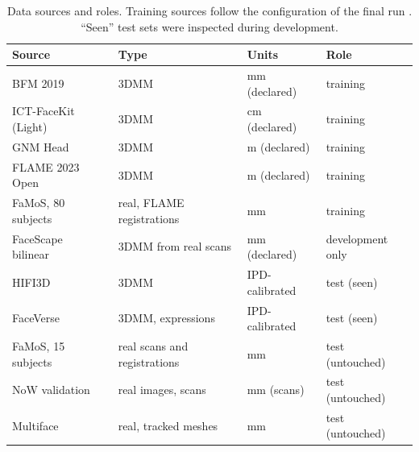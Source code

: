 \begin{table}[!ht]
\centering
\small
\caption{Data sources and roles. Training sources follow the configuration
of the final run . ``Seen'' test sets were inspected during development.}
\label{tab:domain_roles}
\begin{tabular}{llll}
\toprule
Source & Type & Units & Role \\
\midrule
BFM 2019~\cite{bfm2019}            & 3DMM          & mm (declared)       & training \\
ICT-FaceKit (Light)~\cite{ict-facekit} & 3DMM      & cm (declared)       & training \\
GNM Head~\cite{gnm}                & 3DMM          & m (declared)        & training \\
FLAME 2023 Open~\cite{flame}       & 3DMM          & m (declared)        & training \\
FaMoS, 80 subjects~\cite{famos}    & real, FLAME registrations & mm      & training \\
\midrule
FaceScape bilinear~\cite{facescape} & 3DMM from real scans & mm (declared) & development only \\
\midrule
HIFI3D~\cite{hifi3d}               & 3DMM          & IPD-calibrated      & test (seen) \\
FaceVerse~\cite{faceverse}         & 3DMM, expressions & IPD-calibrated  & test (seen) \\
FaMoS, 15 subjects~\cite{famos}    & real scans and registrations & mm   & test (untouched) \\
NoW validation~\cite{now}          & real images, scans & mm (scans)     & test (untouched) \\
Multiface~\cite{wuu2022multiface}  & real, tracked meshes & mm           & test (untouched) \\
\bottomrule
\end{tabular}
\end{table}

